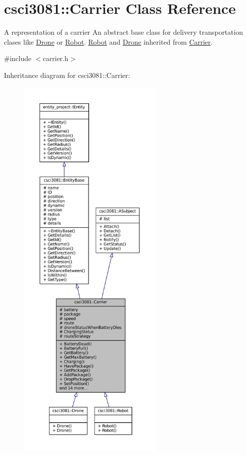 \hypertarget{classcsci3081_1_1Carrier}{}\section{csci3081\+:\+:Carrier Class Reference}
\label{classcsci3081_1_1Carrier}


A representation of a carrier An abstract base class for delivery transportation clases like \hyperlink{classcsci3081_1_1Drone}{Drone} or \hyperlink{classcsci3081_1_1Robot}{Robot}. \hyperlink{classcsci3081_1_1Robot}{Robot} and \hyperlink{classcsci3081_1_1Drone}{Drone} inherited from \hyperlink{classcsci3081_1_1Carrier}{Carrier}.  




{\ttfamily \#include $<$carrier.\+h$>$}



Inheritance diagram for csci3081\+:\+:Carrier\+:
\nopagebreak
\begin{figure}[H]
\begin{center}
\leavevmode
\includegraphics[height=550pt]{classcsci3081_1_1Carrier__inherit__graph}
\end{center}
\end{figure}
